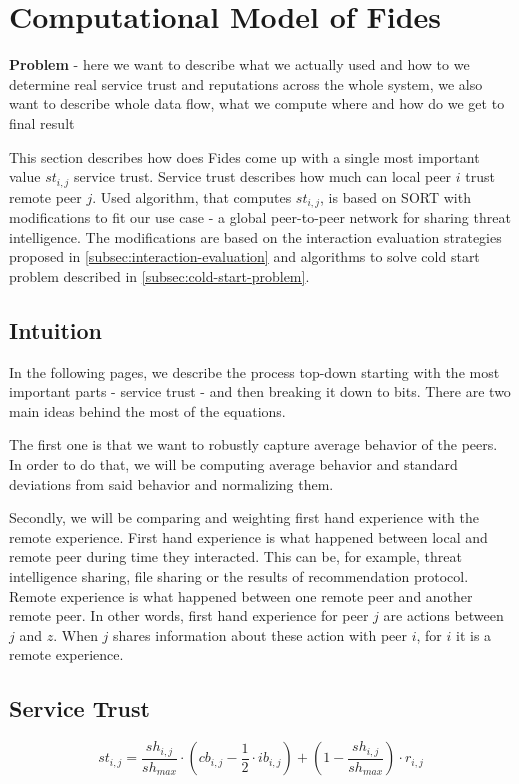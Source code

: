 \section{Computational Model of Fides}
\label{sec:computational-model}
\textbf{Problem} - here we want to describe what we actually used and how to we determine real service trust and reputations across  the whole system, we also want to describe whole data flow, what we compute where and how do we get to final result

\vspace{10mm}

This section describes how does Fides come up with a single most important value $st_{i,j}$ service trust. Service trust describes how much can local peer $i$ trust remote peer $j$.
Used algorithm, that computes $st_{i,j}$, is based on SORT\cite{sort} with modifications to fit our use case - a global peer-to-peer network for sharing threat intelligence. The modifications are based on the interaction evaluation strategies proposed in \ref{subsec:interaction-evaluation} and algorithms to solve cold start problem described in \ref{subsec:cold-start-problem}.

\subsection{Intuition}
In the following pages, we describe the process top-down starting with the most important parts - service trust - and then breaking it down to bits.
There are two main ideas behind the most of the equations. 

The first one is that we want to robustly capture average behavior of the peers. In order to do that, we will be computing average behavior and standard deviations from said behavior and normalizing them.

Secondly, we will be comparing and weighting first hand experience with the remote experience. 
First hand experience is what happened between local and remote peer during time they interacted. This can be, for example, threat intelligence sharing, file sharing or the results of recommendation protocol.
Remote experience is what happened between one remote peer and another remote peer. In other words, first hand experience for peer $j$ are actions between $j$ and $z$. When $j$ shares information about these action with peer $i$, for $i$ it is a remote experience.

\subsection{Service Trust}

\begin{equation}\label{eq:service-trust}
st_{i,j}=\frac{sh_{i,j}}{sh_{max}} \cdot \left(cb_{i,j} - \frac{1}{2} \cdot ib_{i,j} \right) +\left(1-\frac{sh_{i,j}}{sh_{max}}\right) \cdot r_{i,j}
\end{equation}
